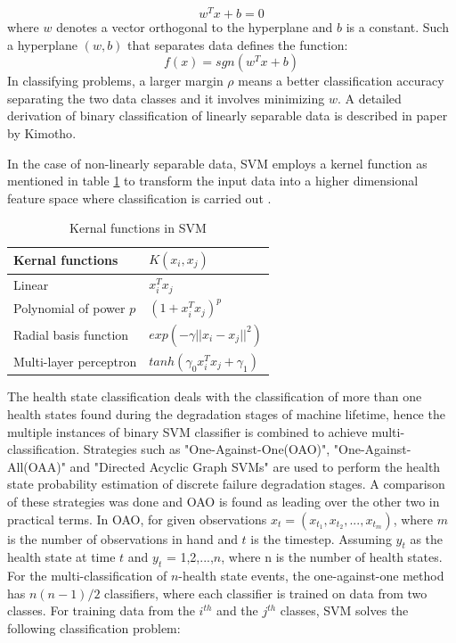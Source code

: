 \begin{equation}
    w^T x + b = 0
\end{equation}
where $w$ denotes a vector orthogonal to the hyperplane and $b$ is a constant\cite{DBLP:phd/dnb/Kimotho16}. Such a hyperplane
$(w, b)$ that separates data defines the function:
\begin{equation}
    f(x) = sgn(w^T x + b)
\end{equation}
In classifying problems, a larger margin $\rho$ means a better classification accuracy separating the two data classes and it involves minimizing $w$. A detailed derivation of binary classification of linearly separable data is described in paper by Kimotho\cite{DBLP:phd/dnb/Kimotho16}.

In the case of non-linearly separable data, SVM employs a kernel function as mentioned in table \ref{sec:SVM:Kernal} to transform the input data into a higher dimensional feature space where classification is carried out \cite{Burbidge2001AnIT}. 
\begin{table}[h]
    \centering
	\begin{tabularx}{\textwidth}{| X | X |}
		\hline
		\textbf{Kernal functions} & \textbf{$K(x_i,x_j)$}\\\hline
		Linear & $x_i^T x_j$\\ \hline
		Polynomial of power $p$ & $(1 + x_i^T x_j)^p$\\\hline
        Radial basis function & $exp(-\gamma || x_i - x_j ||^2)$\\\hline
        Multi-layer perceptron & $tanh(\gamma_0 x_i^T x_j + \gamma_1)$\\\hline
    \end{tabularx}
    \captionsetup{justification=centering}
	\caption{Kernal functions in SVM}
    \label{sec:SVM:Kernal}
\end{table}
\vspace*{-4mm}
The health state classification deals with the classification of more than one health states found during the degradation stages of machine lifetime, hence the multiple instances of binary SVM classifier is combined to achieve multi-classification. Strategies such as "One-Against-One(OAO)", "One-Against-All(OAA)" and "Directed Acyclic Graph SVMs" are used to perform the health state probability estimation of discrete failure degradation stages. A comparison of these strategies was done and OAO is found as leading over the other two in practical terms\cite{DBLP:journals/tnn/HsuL02}. In OAO, for given observations $x_t = (x_{t_1}, x_{t_2},...,x_{t_m})$, where $m$ is the number of observations in hand and $t$ is the timestep. Assuming $y_t$ as the health state at time $t$ and $y_t$ = 1,2,...,$n$, where n is the number of health states. For the multi-classification of $n$-health state events, the one-against-one method has $n(n-1)/2$ classifiers, where each classifier is trained on data from two classes. For training data from the $i^{th}$ and the $j^{th}$ classes, SVM solves the following classification problem:
